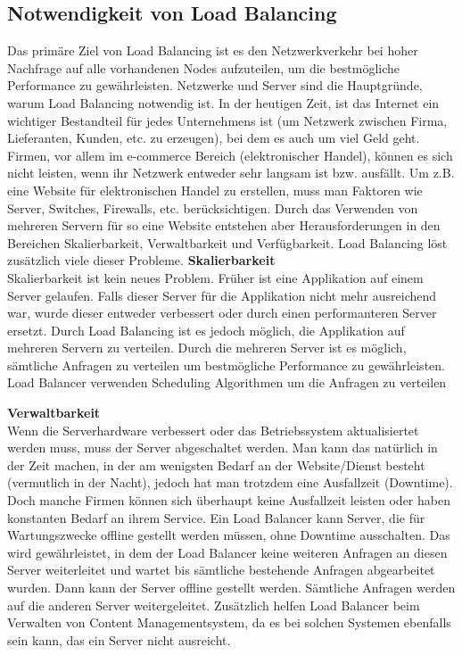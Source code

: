 \subsection{Notwendigkeit von Load Balancing}
\label{sec:Notwendigkeit von Load Balancing}
Das primäre Ziel von Load Balancing ist es den Netzwerkverkehr bei hoher Nachfrage auf alle vorhandenen Nodes aufzuteilen, um die bestmögliche Performance zu gewährleisten. Netzwerke und Server sind die Hauptgründe, warum Load Balancing notwendig ist. In der heutigen Zeit, ist das Internet ein wichtiger Bestandteil für jedes Unternehmens ist (um Netzwerk zwischen Firma, Lieferanten, Kunden, etc. zu erzeugen), bei dem es auch um viel Geld geht. Firmen, vor allem im e-commerce Bereich (elektronischer Handel), können es sich nicht leisten, wenn ihr Netzwerk entweder sehr langsam ist bzw. ausfällt. 
Um z.B. eine Website für elektronischen Handel zu erstellen, muss man Faktoren wie Server, Switches, Firewalls, etc. berücksichtigen. Durch das Verwenden von mehreren Servern für so eine Website entstehen aber Herausforderungen in den Bereichen Skalierbarkeit, Verwaltbarkeit und Verfügbarkeit. Load Balancing löst zusätzlich viele dieser Probleme.\vspace{5mm}
\textbf{Skalierbarkeit} \\

Skalierbarkeit ist kein neues Problem. Früher ist eine Applikation auf einem Server gelaufen. Falls dieser Server für die Applikation nicht mehr ausreichend war, wurde dieser entweder verbessert oder durch einen performanteren Server ersetzt. Durch Load Balancing ist es jedoch möglich, die Applikation auf mehreren Servern zu verteilen. Durch die mehreren Server ist es möglich, sämtliche Anfragen zu verteilen um bestmögliche Performance zu gewährleisten. Load Balancer verwenden Scheduling Algorithmen um die Anfragen zu verteilen\vspace{5mm}

\textbf{Verwaltbarkeit} \\

Wenn die Serverhardware verbessert oder das Betriebssystem aktualisiertet werden muss, muss der Server abgeschaltet werden. Man kann das natürlich in der Zeit machen, in der am wenigsten Bedarf an der Website/Dienst besteht (vermutlich in der Nacht), jedoch hat man trotzdem eine Ausfallzeit (Downtime). Doch manche Firmen können sich überhaupt keine Ausfallzeit leisten oder haben konstanten Bedarf  an ihrem Service. Ein Load Balancer kann Server, die für Wartungszwecke offline gestellt werden müssen, ohne Downtime ausschalten. Das wird gewährleistet, in dem der Load Balancer keine weiteren Anfragen an diesen Server weiterleitet und wartet bis sämtliche bestehende Anfragen abgearbeitet wurden. Dann kann der Server offline gestellt werden. Sämtliche Anfragen werden auf die anderen Server weitergeleitet. Zusätzlich helfen Load Balancer beim Verwalten von Content Managementsystem, da es bei solchen Systemen ebenfalls sein kann, das ein Server nicht ausreicht.\vspace{5mm}   

